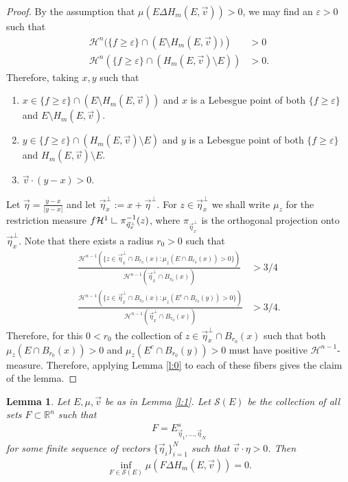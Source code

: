 \documentclass[12pt]{amsart}
\numberwithin{equation}{section}
\theoremstyle{plain}
\newtheorem{lemma}[theorem]{Lemma}
\theoremstyle{definition}
\newcommand{\res}{\hbox{ {\vrule height .22cm}{\leaders\hrule\hskip.2cm} }}
\begin{document}
\begin{proof}
By the assumption that $\mu(E\Delta H_m(E, \vec{v}))>0$, we may find an $\varepsilon>0$ such that 
\begin{align*}
    \mathcal{H}^{n}(\{f \ge \varepsilon\} \cap \left(E \setminus H_m(E, \vec{v}))\right) & > 0\\
    \mathcal{H}^n(\{f \ge \varepsilon\} \cap \left(H_m(E, \vec{v}) \setminus E\right)) & > 0.
\end{align*}
Therefore, taking $x, y$ such that 
\begin{enumerate}
    \item $x \in \{f \ge \varepsilon\} \cap \left(E \setminus H_m(E, \vec{v})\right)$ and $x$ is a Lebesgue point of both $\{f \ge \varepsilon\}$ and $E \setminus H_m(E, \vec{v})$.
    \item $y \in \{f \ge \varepsilon\} \cap \left(H_m(E, \vec{v}) \setminus E\right)$ and $y$ is a Lebesgue point of both $\{f \ge \varepsilon\}$ and $H_m(E, \vec{v})\setminus E$.
    \item $\vec{v}\cdot (y-x)>0$.
\end{enumerate}
Let $\vec{\eta} = \frac{y-x}{|y-x|}$ and let $\vec{\eta}^\perp_x := x+ \vec{\eta}^\perp$. For $z \in \vec{\eta}^{\perp}_x$ we shall write $\mu_z$ for the restriction measure $f\mathcal{H}^{1}\res \pi_{\vec{\eta}_x^{\perp}}^{-1}(z)$, where $\pi_{\vec{\eta}_x^{\perp}}$ is the orthogonal projection onto $\vec{\eta}^{\perp}_x$.  Note that there exists a radius $r_0>0$ such that 
\begin{align*}
    \frac{\mathcal{H}^{n-1}(\{z \in \vec{\eta}^\perp_x \cap B_{r_0}(x): \mu_z(E \cap B_{r_0}(x))>0\})}{\mathcal{H}^{n-1}(\vec{\eta}^\perp_x \cap B_{r_0}(x))} & > 3/4\\
    \frac{\mathcal{H}^{n-1}(\{z \in \vec{\eta}^\perp_x \cap B_{r_0}(x): \mu_z(E^c \cap B_{r_0}(y))>0\})}{\mathcal{H}^{n-1}(\vec{\eta}^\perp_x \cap B_{r_0}(x))} & > 3/4.
\end{align*}
Therefore, for this $0<r_0$ the collection of $z \in \vec{\eta}^\perp_x \cap B_{r_0}(x)$ such that both $\mu_z(E \cap B_{r_0}(x))>0$ and $\mu_z(E^c \cap B_{r_0}(y))>0$ must have positive $\mathcal{H}^{n-1}$-measure.  Therefore, applying Lemma \ref{l:0} to each of these fibers gives the claim of the lemma.
\end{proof}


\begin{lemma}\label{l:filling all the holes}
Let $E, \mu, \vec{v}$ be as in Lemma \ref{l:1}. Let $\mathcal{S}(E)$ be the collection of all sets $F \subset \mathbb{R}^n$ such that 
\begin{align*}
    F = E^s_{\vec{\eta}_1, ..., \vec{\eta}_N}
\end{align*}
for some finite sequence of vectors $\{\vec{\eta}_i \}_{i=1}^N$ such that $\vec{v} \cdot \eta >0$.  Then
    \begin{align*}
        \inf_{F \in \mathcal{S}(E)} \mu(F \Delta H_m(E, \vec{v})) =0.
    \end{align*}
\end{lemma}
\end{document}
